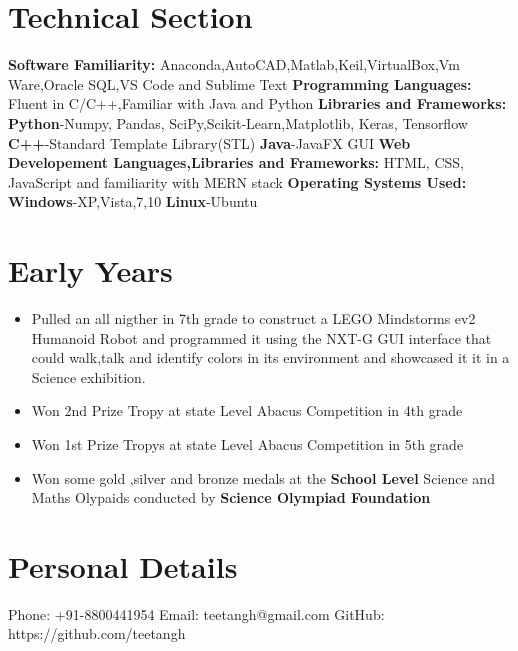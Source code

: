 \documentclass[a4paper,12pt]{article}
\begin{document}
\section*{Technical Section}
\textbf{Software Familiarity: }
\newline
Anaconda,AutoCAD,Matlab,Keil,VirtualBox,Vm Ware,Oracle SQL,VS Code and Sublime Text 
\newline
\textbf{Programming Languages: }
Fluent in C/C++,Familiar with Java and Python
\newline
\textbf{Libraries and Frameworks: }
\newline
\textbf{Python}-Numpy, Pandas, SciPy,Scikit-Learn,Matplotlib, Keras, Tensorflow    
\newline
\textbf{C++}-Standard Template Library(STL)    
\newline
\textbf{Java}-JavaFX GUI    
\newline
\textbf{Web Developement Languages,Libraries and Frameworks: }
\newline
HTML, CSS, JavaScript and familiarity with MERN stack 
\newline
\textbf{Operating Systems Used: }
\newline
\textbf{Windows}-XP,Vista,7,10
\newline 
\textbf{Linux}-Ubuntu


\section*{Early Years}
\begin{itemize}
    \item Pulled an all nigther in 7th grade to construct a LEGO Mindstorms ev2 
    Humanoid Robot and programmed it using the NXT-G GUI interface that could walk,talk 
    and identify colors in its environment and showcased it it in a Science exhibition.
    \item Won 2nd Prize Tropy at state Level Abacus Competition in 4th grade     
    \item Won 1st Prize Tropys at state Level Abacus Competition in 5th grade
    \item Won some gold ,silver and bronze medals at the \textbf{School Level}  Science 
    and Maths Olypaids conducted by \textbf{Science Olympiad Foundation}            
    
\end{itemize}

\section*{Personal Details}
Phone: +91-8800441954
\newline
Email: teetangh@gmail.com
\newline
GitHub: https://github.com/teetangh

\end{document}
